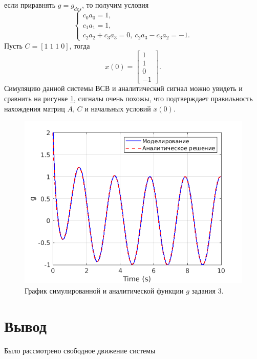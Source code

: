 если приравнять $g=g_{des}$, то получим условия
\begin{equation*}
    \begin{cases}
        c_0a_0=1,\\
        c_1a_1=1,\\
        c_2a_2+c_3a_3=0,\
        c_2a_3-c_3a_2=-1.
    \end{cases}
\end{equation*}
Пусть $C=[1\; 1\; 1\; 0]$, тогда
\begin{equation*}
    x(0)=\begin{bmatrix}
        1\\1\\0\\-1
    \end{bmatrix}.
\end{equation*}
Симуляцию данной системы ВСВ и аналитический сигнал можно увидеть и сравнить
на рисунке \ref{fig:task_3_out}, сигналы очень похожы, что подтверждает
правильность нахождения матриц $A$, $C$ и начальных условий $x(0)$.

\begin{figure}
    \centering
    \includegraphics[width=1\textwidth]{figs/task_3_out.png}
    \caption{График симулированной и аналитической функции $g$ задания 3.}
    \label{fig:task_3_out}
\end{figure}




\section{Вывод}

Было рассмотрено свободное движение системы


\newpage


